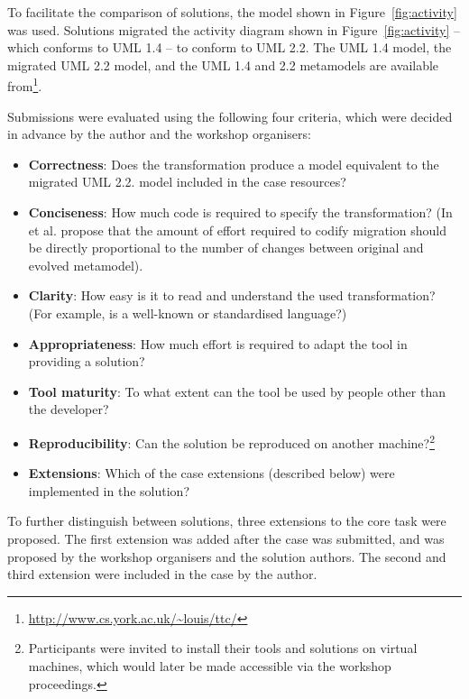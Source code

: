 To facilitate the comparison of solutions, the model shown in Figure~\ref{fig:activity} was used. Solutions migrated the activity diagram shown in Figure~\ref{fig:activity} -- which conforms to UML 1.4 -- to conform to UML 2.2. The UML 1.4 model, the migrated UML 2.2 model, and the UML 1.4 and 2.2 metamodels are available from\footnote{\url{http://www.cs.york.ac.uk/~louis/ttc/}}.

Submissions were evaluated using the following four criteria, which were decided in advance by the author and the workshop organisers:

\begin{itemize}
	\item \textbf{Correctness}: Does the transformation produce a model equivalent to the migrated UML 2.2. model included in the case resources?
	\item \textbf{Conciseness}: How much code is required to specify the transformation? (In \cite{sprinkle04domain} et al. propose that the amount of effort required to codify migration should be directly proportional to the number of changes between original and evolved metamodel).
		\item \textbf{Clarity}: How easy is it to read and understand the used transformation? (For example, is a well-known or standardised language?)
		\item \textbf{Appropriateness}: How much effort is required to adapt the tool in providing a solution?
		\item \textbf{Tool maturity}: To what extent can the tool be used by people other than the developer? 
		\item \textbf{Reproducibility}: Can the solution be reproduced on another machine?\footnote{Participants were invited to install their tools and solutions on virtual machines, which would later be made accessible via the workshop proceedings.}
		\item \textbf{Extensions}: Which of the case extensions (described below) were implemented in the solution?
\end{itemize}

To further distinguish between solutions, three extensions to the core task were proposed. The first extension was added after the case was submitted, and was proposed by the workshop organisers and the solution authors. The second and third extension were included in the case by the author. 

